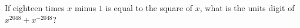 If eighteen times $x$ minus $1$ is equal to the square of $x$, what is the units digit of $x^{2048}+x^{-2048}$?
